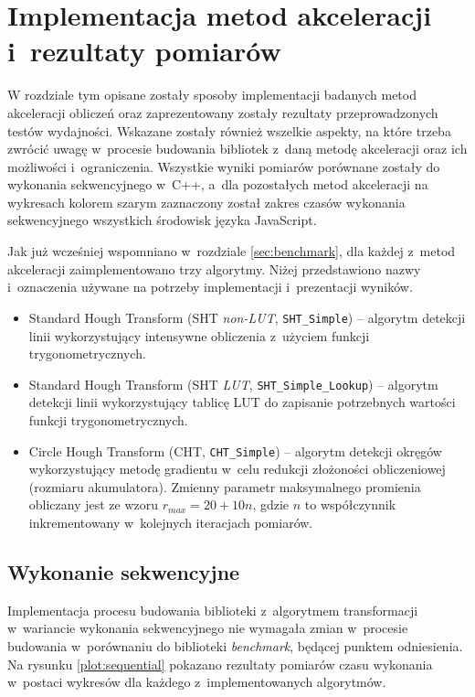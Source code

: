 \chapter{Implementacja metod akceleracji i~rezultaty pomiarów}
\label{sec:methods-results}

W rozdziale tym opisane zostały sposoby implementacji badanych metod akceleracji obliczeń oraz zaprezentowany zostały rezultaty przeprowadzonych testów wydajności. Wskazane zostały również wszelkie aspekty, na które trzeba zwrócić uwagę w~procesie budowania bibliotek z~daną metodę akceleracji oraz ich możliwości i~ograniczenia. Wszystkie wyniki pomiarów porównane zostały do wykonania sekwencyjnego w~C++, a~dla pozostałych metod akceleracji na wykresach kolorem szarym zaznaczony został zakres czasów wykonania sekwencyjnego wszystkich środowisk języka JavaScript.

Jak już wcześniej wspomniano w~rozdziale \ref{sec:benchmark}, dla każdej z~metod akceleracji zaimplementowano trzy algorytmy. Niżej przedstawiono nazwy i~oznaczenia używane na potrzeby implementacji i~prezentacji wyników.

\begin{itemize}
    \item Standard Hough Transform (SHT \textit{non-LUT}, \lstinline{SHT_Simple}) -- algorytm detekcji linii wykorzystujący intensywne obliczenia z~użyciem funkcji trygonometrycznych.
    \item Standard Hough Transform (SHT \textit{LUT}, \lstinline{SHT_Simple_Lookup}) -- algorytm detekcji linii wykorzystujący tablicę LUT do zapisanie potrzebnych wartości funkcji trygonometrycznych.
    \item Circle Hough Transform (CHT, \lstinline{CHT_Simple}) -- algorytm detekcji okręgów wykorzystujący metodę gradientu w~celu redukcji złożoności obliczeniowej (rozmiaru akumulatora). Zmienny parametr maksymalnego promienia obliczany jest ze wzoru $r_{max} = 20+10n$, gdzie $n$ to współczynnik inkrementowany w~kolejnych iteracjach pomiarów.
\end{itemize}


\section{Wykonanie sekwencyjne}

Implementacja procesu budowania biblioteki z~algorytmem transformacji w~wariancie wykonania sekwencyjnego nie wymagała zmian w~procesie budowania w~porównaniu do biblioteki \textit{benchmark}, będącej punktem odniesienia. Na rysunku \ref{plot:sequential} pokazano rezultaty pomiarów czasu wykonania w~postaci wykresów dla każdego z~implementowanych algorytmów.


